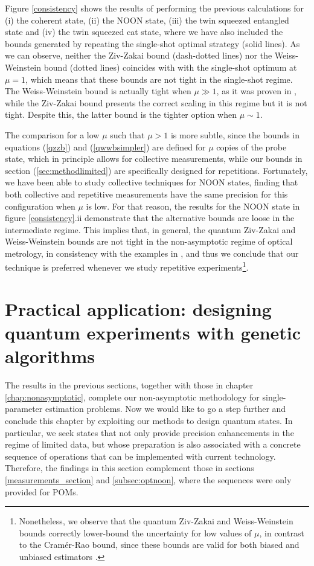 Figure \ref{consistency} shows the results of performing the previous calculations for (i) the coherent state, (ii) the NOON state, (iii) the twin squeezed entangled state and (iv) the twin squeezed cat state, where we have also included the bounds generated by repeating the single-shot optimal strategy (solid lines). As we can observe, neither the Ziv-Zakai bound (dash-dotted lines) nor the Weiss-Weinstein bound (dotted lines) coincides with with the single-shot optimum at $\mu = 1$, which means that these bounds are not tight in the single-shot regime. The Weiss-Weinstein bound is actually tight when $\mu \gg 1$, as it was proven in \cite{tsang2016}, while the Ziv-Zakai bound presents the correct scaling in this regime but it is not tight. Despite this, the latter bound is the tighter option when $\mu \sim 1$. 

The comparison for a low $\mu$ such that $\mu > 1$ is more subtle, since the bounds in equations (\ref{qzzb}) and (\ref{qwwbsimpler}) are defined for $\mu$ copies of the probe state, which in principle allows for collective measurements, while our bounds in section (\ref{sec:methodlimited}) are specifically designed for repetitions. Fortunately, we have been able to study collective techniques for NOON states, finding that both collective and repetitive measurements have the same precision for this configuration when $\mu$ is low. For that reason, the results for the NOON state in figure \ref{consistency}.ii demonstrate that the alternative bounds are loose in the intermediate regime. This implies that, in general, the quantum Ziv-Zakai and Weiss-Weinstein bounds are not tight in the non-asymptotic regime of optical metrology, in consistency with the examples in \cite{tsang2016}, and thus we conclude that our technique is preferred whenever we study repetitive experiments\footnote{Nonetheless, we observe that the quantum Ziv-Zakai and Weiss-Weinstein bounds correctly lower-bound the uncertainty for low values of $\mu$, in contrast to the Cram\'{e}r-Rao bound, since these bounds are valid for both biased and unbiased estimators \cite{tsang2012, tsang2016,  bayesbounds2007}.}. 

\section{Practical application: designing quantum experiments with genetic algorithms}
\label{sec:genetic}

The results in the previous sections, together with those in chapter \ref{chap:nonasymptotic}, complete our non-asymptotic methodology for single-parameter estimation problems. Now we would like to go a step further and conclude this chapter by exploiting our methods to design quantum states. In particular, we seek states that not only provide precision enhancements in the regime of limited data, but whose preparation is also associated with a concrete sequence of operations that can be implemented with current technology. Therefore, the findings in this section complement those in sections \ref{measurements_section} and \ref{subsec:optnoon}, where the sequences were only provided for POMs.

